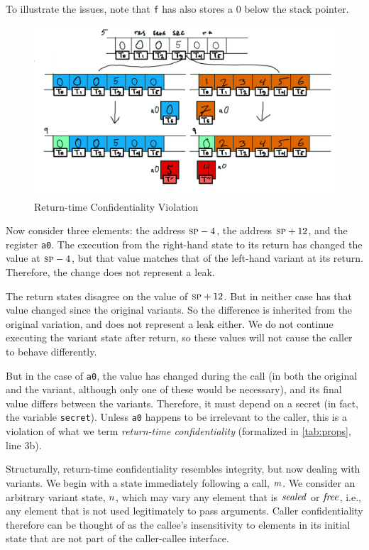 \documentclass[10pt,conference]{ieeetran}%
\theoremstyle{definition}
\begin{document}
To illustrate the issues, note that {\tt f} has also stores a 0 below the stack pointer.
%
\begin{figure}
  \includegraphics[width=\columnwidth]{variants3.png}
  \caption{Return-time Confidentiality Violation}
  \label{fig:variant3}
\end{figure}
%
Now consider three elements: the address \(\textsc{sp} - 4\), the address \(\textsc{sp} + 12\),
and the register {\tt a0}. The execution from the right-hand state to its return
has changed the value at \(\textsc{sp} - 4\), but that value matches that of the
left-hand variant at its return. Therefore, the change does not represent a leak.

The return states disagree on the value of \(\textsc{sp} + 12\). But in neither
case has that value changed since the original variants. So the difference is inherited from
the original variation, and does not represent a leak either. We do not continue executing the
variant state after return, so these values will not cause the caller to behave differently.

But in the case of {\tt a0}, the value has changed during the call (in both the original
and the variant, although only one of these would be necessary), and its final value
differs between the variants.
Therefore, it must depend on a secret (in fact, the variable {\tt secret}).
Unless {\tt a0} happens to be irrelevant to the caller, this is a violation of what
we term {\it return-time confidentiality} (formalized in \cref{tab:props}, line 3b).

Structurally, return-time confidentiality resembles integrity, but now dealing with
variants. We begin with a state immediately following
a call, \(m\). We consider an arbitrary variant state,
\(n\), which may vary any element that is \(\mathit{sealed}\) or \(\mathit{free}\),
i.e., any element that is not used legitimately to pass arguments. Caller confidentiality
therefore can be thought of as the callee's insensitivity to elements in its initial state
that are not part of the caller-callee interface.
\end{document}
